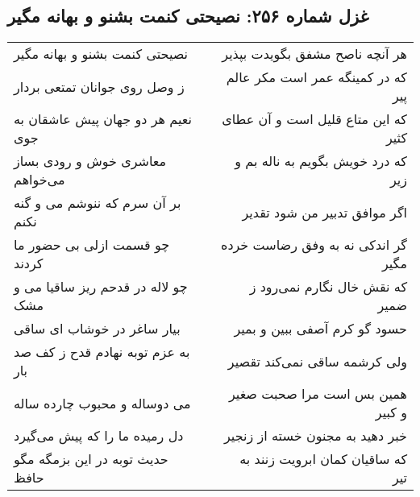\begin{center}
\section*{غزل شماره ۲۵۶: نصیحتی کنمت بشنو و بهانه مگیر}
\label{sec:sh256}
\begin{longtable}{l p{0.5cm} r}
نصیحتی کنمت بشنو و بهانه مگیر
&&
هر آنچه ناصح مشفق بگویدت بپذیر
\\
ز وصل روی جوانان تمتعی بردار
&&
که در کمینگه عمر است مکر عالم پیر
\\
نعیم هر دو جهان پیش عاشقان به جوی
&&
که این متاع قلیل است و آن عطای کثیر
\\
معاشری خوش و رودی بساز می‌خواهم
&&
که درد خویش بگویم به ناله بم و زیر
\\
بر آن سرم که ننوشم می و گنه نکنم
&&
اگر موافق تدبیر من شود تقدیر
\\
چو قسمت ازلی بی حضور ما کردند
&&
گر اندکی نه به وفق رضاست خرده مگیر
\\
چو لاله در قدحم ریز ساقیا می و مشک
&&
که نقش خال نگارم نمی‌رود ز ضمیر
\\
بیار ساغر در خوشاب ای ساقی
&&
حسود گو کرم آصفی ببین و بمیر
\\
به عزم توبه نهادم قدح ز کف صد بار
&&
ولی کرشمه ساقی نمی‌کند تقصیر
\\
می دوساله و محبوب چارده ساله
&&
همین بس است مرا صحبت صغیر و کبیر
\\
دل رمیده ما را که پیش می‌گیرد
&&
خبر دهید به مجنون خسته از زنجیر
\\
حدیث توبه در این بزمگه مگو حافظ
&&
که ساقیان کمان ابرویت زنند به تیر
\\
\end{longtable}
\end{center}
